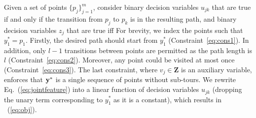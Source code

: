 

Given a set of points $\{p_j\}_{j=1}^m$, 
consider binary decision variables $u_{jk}$ that are true if and only if
the transition from $p_j$ to $p_k$ is in the resulting path,
and binary decision variables $z_j$ that are true iff 
For brevity, we index the points such that $y_1^* = p_1$.
Firstly, the desired path should start from $y_1^*$ (Constraint~\ref{eq:cons1}).
In addition, only $l\!-\!1$ transitions between points are permitted as the path length is $l$ (Constraint~\ref{eq:cons2}).
Moreover, any point could be visited at most once (Constraint~\ref{eq:cons3}).
The last constraint, where $v_j \in \mathbf{Z}$ is an auxiliary variable,
enforces that $\mathbf{y}^*$ is a single sequence of points without sub-tours.
We rewrite Eq.~(\ref{eq:jointfeature}) into a linear function of decision variables $u_{jk}$
(dropping the unary term corresponding to $y_1^*$ as it is a constant), which results in ~(\ref{eq:obj}).

